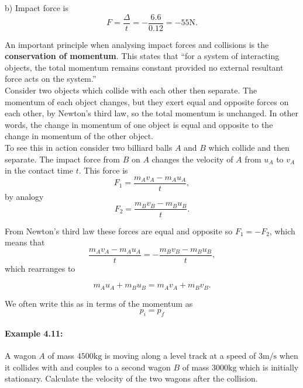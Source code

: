 \documentclass[a4paper,12pt]{book}
\begin{document}
b) Impact force is
\begin{equation*}
F=\frac{\Delta}{t}=-\frac{6.6}{0.12}=-55\text{N}.
\end{equation*}

An important principle when analysing impact forces and collisions is the \textbf{conservation of momentum}. This states that ``for a system of interacting objects, the total momentum remains constant provided no external resultant force acts on the system.''\\

Consider two objects which collide with each other then separate. The momentum of each object changes, but they exert equal and opposite forces on each other, by Newton's third law, so the total momentum is unchanged. In other words, the change in momentum of one object is equal and opposite to the change in momentum of the other object. \\

To see this in action consider two billiard balls $A$ and $B$ which collide and then separate. The impact force from $B$ on $A$ changes the velocity of $A$ from $u_{A}$ to $v_{A}$ in the contact time $t$. This force is
\begin{equation*}
F_{1}=\frac{m_{A}v_{A}-m_{A}u_{A}}{t},
\end{equation*}
by analogy
\begin{equation*}
F_{2}=\frac{m_{B}v_{B}-m_{B}u_{B}}{t}.
\end{equation*}

From Newton's third law these forces are equal and opposite so $F_{1}=-F_{2}$, which means that
\begin{equation*}
\frac{m_{A}v_{A}-m_{A}u_{A}}{t}=-\frac{m_{B}v_{B}-m_{B}u_{B}}{t},
\end{equation*}
which rearranges to

\begin{equation*}
m_{A}u_{A}+m_{B}u_{B}=m_{A}v_{A}+m_{B}v_{B}.
\end{equation*}

We often write this as in terms of the momentum as
\begin{equation}
p_{i}=p_{f}
\label{eq: conservation of momentum}
\end{equation}

\paragraph{Example 4.11:} A wagon $A$ of mass $4500\text{kg}$ is moving along a level track at a speed of $3\text{m/s}$ when it collides with and couples to a second wagon $B$ of mass $3000\text{kg}$ which is initially stationary. Calculate the velocity of the two wagons after the collision.\\
\end{document}

